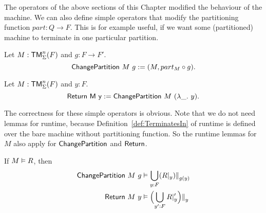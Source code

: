 The operators of the above sections of this Chapter modified the behaviour of the machine.  We can also define simple operators that modify the
partitioning function $part : Q \to F$.  This is for example useful, if we want some (partitioned) machine to terminate in one particular partition.

\begin{definition}[$\MS{ChangePartition}$]
  Let $M:\mathsf{TM}_\Sigma^n(F)$ and $g : F \to F'$.
  \[ \mathsf{ChangePartition}~M~g := (M, part_M \circ g). \]
\end{definition}

\begin{definition}
  Let $M:\mathsf{TM}_\Sigma^n(F)$ and $y:F$.
  \[ \mathsf{Return~M~y} := \mathsf{ChangePartition}~M~(\lambda \_.~y). \]
\end{definition}

The correctness for these simple operators is obvious.  Note that we do not need lemmas for runtime, because Definition~\ref{def:TerminatesIn} of
runtime is defined over the bare machine without partitioning function.  So the runtime lemmas for $M$ also apply for $\MS{ChangePartition}$ and
$\mathsf{Return}$.
\begin{lemma}
  If $M \mathrel{\vDash} R$, then
  \begin{alignat*}{1}
    \mathsf{ChangePartition}~M~g & \mathrel{\vDash} \bigcup_{y:F} (R {|}_{y}) {|\mkern-1.5mu|}_{g(y)} \\
    \mathsf{Return}~M~y          & \mathrel{\vDash} \Bigl( \bigcup_{y':F} R {|}_{y}' \Bigr) {|\mkern-1.5mu|}_{y}
  \end{alignat*}
\end{lemma}


